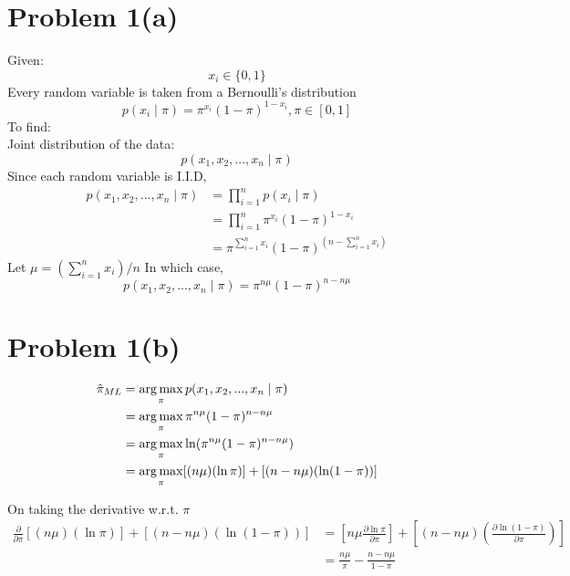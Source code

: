 \documentclass[openany,11pt]{homework}
\begin{document}
\maketitle

\section*{Problem 1(a)}

Given:
\begin{equation}
x_i \in \{0, 1\}
\end{equation}
Every random variable is taken from a Bernoulli's distribution
\begin{equation}
p(x_i\mid\pi) = \pi^{x_i}(1-\pi)^{1-x_i}, \pi \in [0, 1]
\end{equation}
To find:\\
Joint distribution of the data:
$$
p(x_1, x_2, ..., x_n \mid \pi)
$$
Since each random variable is I.I.D,
\begin{align}
	p(x_1, x_2, ..., x_n \mid \pi) & = \prod_{i = 1}^{n} p(x_i \mid \pi) \\
								   & = \prod_{i = 1}^{n} \pi^{x_i}(1-\pi)^{1-x_i} \\
								   & = \pi^{\sum_{i=1}^{n} x_i}(1-\pi)^{(n-\sum_{i=1}^{n} x_i)}
\end{align}
Let $\mu = (\sum_{i=1}^{n} x_i)/ n$ In which case, \\
$$
p(x_1, x_2, ..., x_n \mid \pi) = \pi^{n\mu}(1-\pi)^{n-n\mu}
$$

\section*{Problem 1(b)}

\begin{align}
\hat{\pi}_{ML} & = \operatornamewithlimits{arg\,max}_{\pi} p(x_1, x_2, ..., x_n \mid \pi) \\
			   & = \operatornamewithlimits{arg\,max}_{\pi} \pi^{n\mu}(1-\pi)^{n-n\mu} \\
			   & = \operatornamewithlimits{arg\,max}_{\pi} \ln(\pi^{n\mu}(1-\pi)^{n-n\mu}) \\
			   & = \operatornamewithlimits{arg\,max}_{\pi} [(n\mu) (\ln \pi)] + [(n - n\mu)(\ln (1-\pi))]
\end{align}

On taking the derivative w.r.t. $\pi$\\
\begin{align}
\frac{\partial }{\partial \pi} [(n\mu) (\ln \pi)] + [(n - n\mu)(\ln (1-\pi))]
& = \left[n\mu \frac{\partial \ln \pi}{\partial \pi}\right] + \left[(n - n\mu)\left(\frac{\partial \ln(1-\pi)}{\partial \pi}\right)\right] \\
& = \frac{n\mu}{\pi} -\frac{n-n\mu}{1-\pi}
\end{align}
\end{document}
